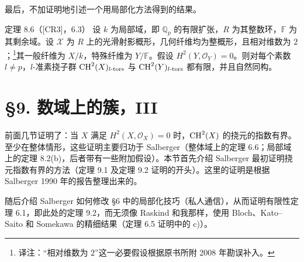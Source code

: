 最后，不加证明地引述一个用局部化方法得到的结果。
\begin{statement}{定理 8.6（[CR3]，6.3）}
设 $k$ 为局部域，即 $\mathbb Q_p$ 的有限扩张，$R$ 为其整数环，$\mathbb F$ 为其剩余域。设 $\mathcal X$ 为 $R$ 上的光滑射影概形，几何纤维均为整概形，且相对维数为 $2$；\footnote{译注：“相对维数为 $2$”这一必要假设根据原书所附 2008 年勘误补入。}其一般纤维为 $X/k$，特殊纤维为 $Y/\mathbb F$。假设 $H^2(Y,\mathcal O_Y)=0$。则对每个素数 $l\ne p$，$l$-准素挠子群 $\operatorname{CH}^2(X)_{l\text{-}\mathrm{tors}}$ 与 $\operatorname{CH}^2(Y)_{l\text{-}\mathrm{tors}}$ 都有限，并且自然同构。
\end{statement}

\section*{§9. 数域上的簇，III}
前面几节证明了：当 $X$ 满足 $H^2(X,\mathcal O_X)=0$ 时，$\operatorname{CH}^2(X)$ 的挠元的指数有界。至少在整体情形，这些证明主要归功于 Salberger（整体域上的定理 6.6；局部域上的定理 8.2(b)，后者带有一些附加假设）。本节首先介绍 Salberger 最初证明挠元指数有界的方法（定理 9.1 及定理 9.2 证明的开头）。这里的证明是根据 Salberger 1990 年的报告整理出来的。

随后介绍 Salberger 如何修改 §6 中的局部化技巧（私人通信），从而证明有限性定理 6.1，即此处的定理 9.2，而无须像 Raskind 和我那样，使用 Bloch、Kato--Saito 和 Somekawa 的精细结果（定理 6.5 证明中的 c)）。

